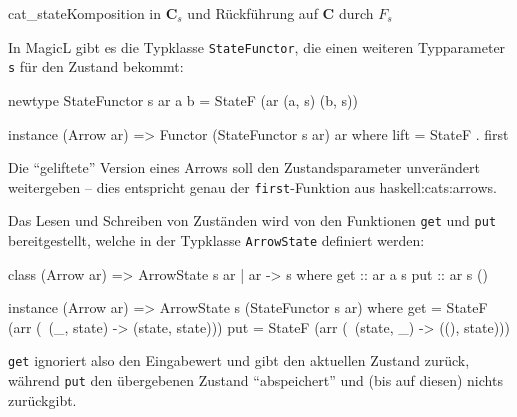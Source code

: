 \documentclass[12pt, a4paper, bibgerm]{scrbook}
\newenvironment{DIFnomarkup}{}{}
\newcommand\icode[1]{\lstinline?#1?}
\newcommand\sref{}
\newcommand\fig{}
\begin{document}
\fig{cat_state}{Komposition in $\mathbf{C}_s$ und Rückführung auf
  $\mathbf{C}$ durch $F_s$}

In MagicL gibt es die Typklasse \icode{StateFunctor}, die einen weiteren
Typparameter \icode{s} für den Zustand bekommt:

\begin{DIFnomarkup}\begin{code}
newtype StateFunctor s ar a b = StateF (ar (a, s) (b, s))

instance (Arrow ar) => Functor (StateFunctor s ar) ar where
    lift = StateF . first
\end{code}\end{DIFnomarkup} %

Die "`geliftete"' Version eines Arrows soll den Zustandsparameter
unverändert weitergeben -- dies entspricht genau der
\icode{first}-Funktion aus \sref{haskell:cats:arrows}.

Das Lesen und Schreiben von Zuständen wird von den Funktionen \icode{get} und
\icode{put} bereitgestellt, welche in der Typklasse \icode{ArrowState}
definiert werden:

\begin{DIFnomarkup}\begin{code}
class (Arrow ar) => ArrowState s ar | ar -> s where
  get :: ar a s
  put :: ar s ()

instance (Arrow ar) => ArrowState s (StateFunctor s ar)
  where
    get = StateF (arr (\ (_, state) -> (state, state)))
    put = StateF (arr (\ (state, _) -> ((), state)))
\end{code}\end{DIFnomarkup}

\icode{get} ignoriert also den Eingabewert und gibt den aktuellen
Zustand zurück, während \icode{put} den übergebenen Zustand
"`abspeichert"' und (bis auf diesen) nichts zurückgibt.
\end{document}
